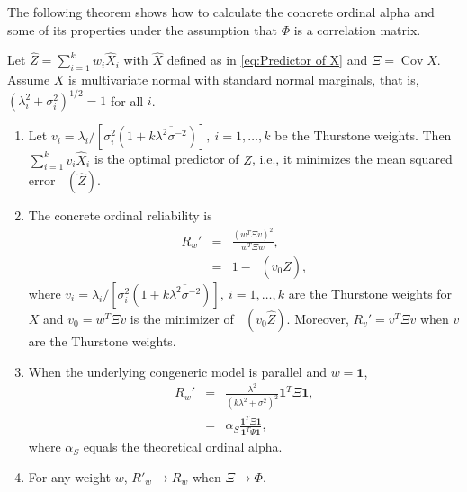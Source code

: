 \documentclass[twoside]{article}
\DeclareMathOperator{\Cov}{Cov}
\DeclareMathOperator{\MSE}{MSE_Z}
\renewcommand{\sqrt}[1]{{(#1)^{1/2}}}
\begin{document}
The following theorem shows how to calculate the concrete ordinal alpha and
some of its properties under the assumption that $\Phi$ is a correlation matrix.
\begin{thm}
\label{thm:omega-prime}Let $\hat{Z}=\sum_{i=1}^{k}w_{i}\hat{X}_{i}$
with $\hat{X}$ defined as in \eqref{eq:Predictor of X} and $\Xi=\Cov\hat{X}$.
Assume $X$ is multivariate normal with standard normal marginals,
that is, $\sqrt{\lambda_{i}^{2}+\sigma_{i}^{2}}=1$ for all $i$.
\begin{enumerate}[label=(\roman*)]
\item Let  $v_{i}=\lambda_{i}/[\sigma_{i}^{2}(1+k\overline{\lambda^{2}\sigma^{-2}})],\:i=1,\ldots,k$ be the Thurstone weights. Then $\sum_{i=1}^{k}v_{i}\hat{X}_{i}$
is the optimal predictor of $Z$, i.e., it minimizes the mean squared
error $\MSE(\hat{Z})$.
\item The concrete ordinal reliability is
\begin{eqnarray}
 R_{w}' & = & \frac{(w^{T}\Xi v)^{2}}{w^{T}\Xi w},\label{eq:Omega prime}\\
 & = & 1-\MSE(v_{0}\hat{Z}),\nonumber 
\end{eqnarray}
where $v_{i}=\lambda_{i}/[\sigma_{i}^{2}(1+k\overline{\lambda^{2}\sigma^{-2}})],\:i=1,\ldots,k$
are the Thurstone weights for $X$ and $v_{0}=w^{T}\Xi v$ is the
minimizer of $\MSE(v_{0}\hat{Z})$. Moreover, $ R_{v}'=v^{T}\Xi v$ when $v$
are the Thurstone weights.
\item When the underlying congeneric model is parallel and $w=\boldsymbol{1}$,
\begin{eqnarray}
 R_{w}' & = & \frac{\lambda^{2}}{(k\lambda^{2}+\sigma^{2})^{2}}\boldsymbol{1}^{T}\Xi\boldsymbol{1},\label{eq:Alpha prime}\\
 & = & \alpha_S\frac{\boldsymbol{1}^{T}\Xi\boldsymbol{1}}{\boldsymbol{1}^{T}\Psi\boldsymbol{1}},\nonumber 
\end{eqnarray}
where $\alpha_S$ equals the theoretical ordinal alpha.
\item For any weight $w$, $ R'_{w}\to R_{w}$ when $\Xi\to\Phi$. 
\end{enumerate}
\end{thm}
\end{document}
